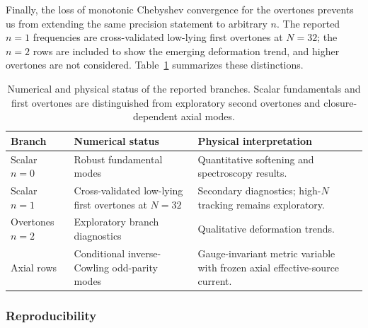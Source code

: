 \documentclass[12pt,a4paper]{article}
\begin{document}
Finally, the loss of monotonic Chebyshev convergence for the overtones prevents
us from extending the same precision statement to arbitrary \(n\). The
reported \(n=1\) frequencies are cross-validated low-lying first overtones at
\(N=32\); the \(n=2\) rows are included to show the emerging deformation trend,
and higher overtones are not considered. Table~\ref{tab:claimhierarchy}
summarizes these distinctions.

\begin{table}[!htbp]
\centering
\footnotesize
\renewcommand{\arraystretch}{1.16}
\setlength{\tabcolsep}{3pt}
\begin{tabularx}{\columnwidth}{>{\raggedright\arraybackslash}p{}>{\raggedright\arraybackslash}p{}>{\raggedright\arraybackslash}X}
\toprule
Branch & Numerical status & Physical interpretation \\
\midrule
Scalar \(n=0\) & Robust fundamental modes & Quantitative softening and spectroscopy results. \\
Scalar \(n=1\) & Cross-validated low-lying first overtones at \(N=32\) & Secondary diagnostics; high-\(N\) tracking remains exploratory. \\
Overtones \(n=2\) & Exploratory branch diagnostics & Qualitative deformation trends. \\
Axial rows & Conditional inverse-Cowling odd-parity modes & Gauge-invariant metric variable with frozen axial effective-source current. \\
\bottomrule
\end{tabularx}
\caption{Numerical and physical status of the reported branches. Scalar
fundamentals and first overtones are distinguished from exploratory second
overtones and closure-dependent axial modes.}
\label{tab:claimhierarchy}
\end{table}

\subsubsection{Reproducibility}
\end{document}
